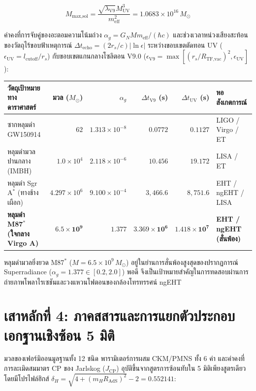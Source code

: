 \documentclass[11pt, a4paper]{article}
\begin{document}
\begin{equation}
M_{\text{max,sol}} = \frac{\sqrt{\lambda_{\text{V9}}} M_{\text{UV}}^3}{m_{\text{eff}}^2} = 1.0683 \times 10^{16}\,M_\odot
\end{equation}

ค่าคงที่การจับคู่ของอะตอมความโน้มถ่วง $\alpha_g = G_N M m_{\text{eff}} / (\hbar c)$ และช่วงเวลาหน่วงเสียงสะท้อนของวัตถุไร้ขอบฟ้าเหตุการณ์ $\Delta t_{\text{echo}} = (2 r_s / c)|\ln \epsilon|$ ระหว่างขอบเขตตัดทอน UV ($\epsilon_{\text{UV}} = l_{\text{cutoff}}/r_s$) กับขอบเขตแกนกลางโซลิตอน V9.0 ($\epsilon_{\text{V9}} = \max[(r_s/R_{\text{TF,vac}})^2, \epsilon_{\text{UV}}]$):

\begin{center}
{\small
\setlength{\tabcolsep}{4.5pt}
\begin{tabular}{p{4.3cm} r r r r p{3.0cm}}
\toprule
\textbf{วัตถุเป้าหมายทางดาราศาสตร์} & \textbf{มวล ($M_\odot$)} & \textbf{$\alpha_g$} & \textbf{$\Delta t_{\text{V9}}$ (s)} & \textbf{$\Delta t_{\text{UV}}$ (s)} & \textbf{หอสังเกตการณ์} \\
\midrule
ซากหลุมดำ GW150914 & $62$ & $1.313 \times 10^{-8}$ & $0.0772$ & $0.1127$ & LIGO / Virgo / ET \\
\rowcolor{rowtint}
หลุมดำมวลปานกลาง (IMBH) & $1.0 \times 10^4$ & $2.118 \times 10^{-6}$ & $10.456$ & $19.172$ & LISA / ET \\
หลุมดำ Sgr A$^*$ (ทางช้างเผือก) & $4.297 \times 10^6$ & $9.100 \times 10^{-4}$ & $3,466.6$ & $8,751.6$ & EHT / ngEHT / LISA \\
\rowcolor{rowtint}
\textbf{หลุมดำ M87$^*$ (ใจกลาง Virgo A)} & $\mathbf{6.5 \times 10^9}$ & $\mathbf{1.377}$ & $\mathbf{3.369 \times 10^6}$ & $\mathbf{1.418 \times 10^7}$ & \textbf{EHT / ngEHT (สั่นพ้อง)} \\
\bottomrule
\end{tabular}
}
\end{center}

หลุมดำมวลยิ่งยวด M87$^*$ ($M = 6.5 \times 10^9\,M_\odot$) อยู่ในย่านการสั่นพ้องสูงสุดของปรากฏการณ์ Superradiance ($\alpha_g = 1.377 \in [0.2, 2.0]$) พอดี จึงเป็นเป้าหมายสำคัญในการทดสอบผ่านการถ่ายภาพโพลาไรเซชันและวงแหวนโฟตอนของกล้องโทรทรรศน์ ngEHT

\section{เสาหลักที่ 4: ภาคสสารและการแยกตัวประกอบเอกฐานเชิงซ้อน 5 มิติ}

มวลของเฟอร์มิออนมูลฐานทั้ง 12 ชนิด พารามิเตอร์การผสม CKM/PMNS ทั้ง 6 ค่า และค่าคงที่การละเมิดสมมาตร CP ของ Jarlskog ($J_{\text{CP}}$) อุบัติขึ้นจากสูตรการซ้อนทับใน 5 มิติเพียงสูตรเดียว โดยมีโปรไฟล์ฮิกส์ $\delta_H = \sqrt{4 + (m_H R_{\text{AdS}})^2} - 2 = 0.552141$:
\end{document}
